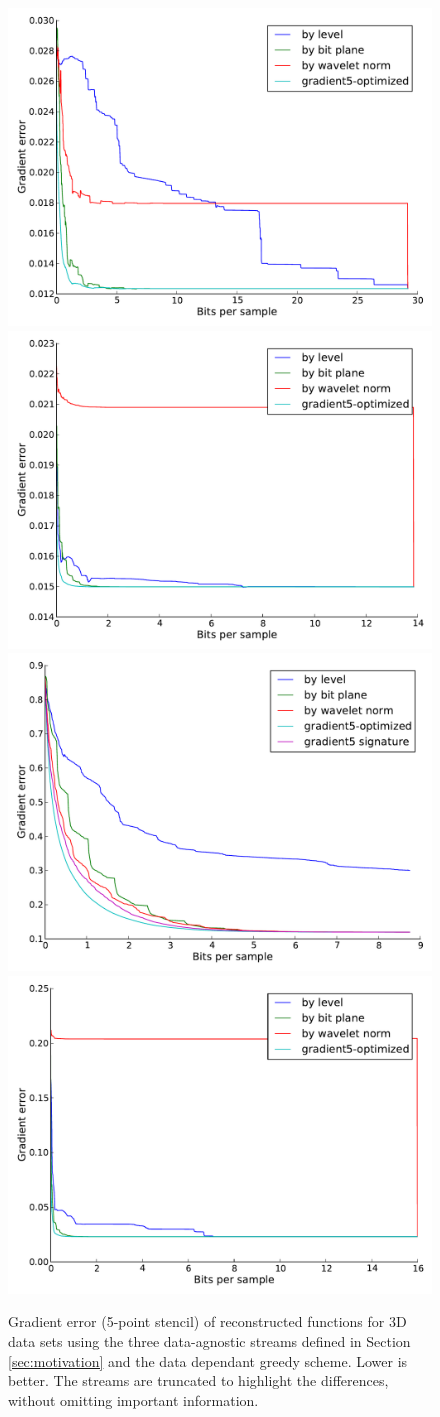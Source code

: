\begin{figure}
  \centering
        {\includegraphics[width=0.48\linewidth]{img/motivation-3d/gradient5-boiler.pdf}}
 	{\includegraphics[width=0.48\linewidth]{img/motivation-3d/gradient5-diffusivity.pdf}}
 	{\includegraphics[width=0.48\linewidth]{img/motivation-3d/gradient5-turbulence.pdf}}
 	{\includegraphics[width=0.48\linewidth]{img/motivation-3d/gradient5-velocityz.pdf}}
 	\caption{Gradient error (5-point stencil) of reconstructed functions for 3D data sets using the three data-agnostic streams
 	defined in Section \ref{sec:motivation} and the data dependant greedy scheme. Lower is better.
        The streams are truncated to highlight
 	the differences, without omitting important information.}
 	\label{fig:motivation-3d-gradient}
\end{figure}


